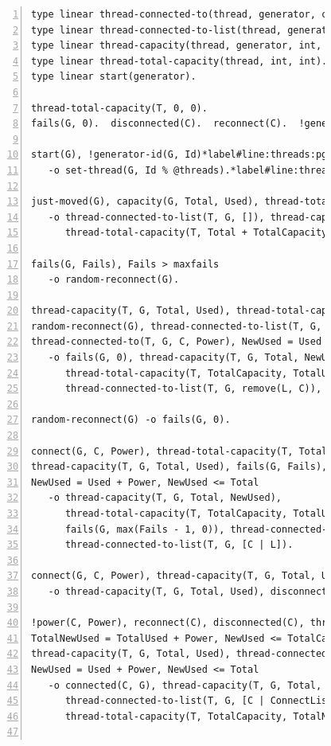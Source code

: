 \begin{figure}[h!]
\begin{Verbatim}[numbers=left,fontsize=\scriptsize,commandchars=*\#\&]
type linear thread-connected-to(thread, generator, consumer, int).
type linear thread-connected-to-list(thread, generator, list consumer).
type linear thread-capacity(thread, generator, int, int).
type linear thread-total-capacity(thread, int, int).
type linear start(generator).

thread-total-capacity(T, 0, 0).
fails(G, 0).  disconnected(C).  reconnect(C).  !generators(C, all-generators).  start(G).

start(G), !generator-id(G, Id)*label#line:threads:pgt_start1&
   -o set-thread(G, Id % @threads).*label#line:threads:pgt_start2&

just-moved(G), capacity(G, Total, Used), thread-total-capacity(T, TotalCapacity, TotalUsed)*label#line:threads:pgt_moved1&
   -o thread-connected-to-list(T, G, []), thread-capacity(T, G, Total, Used),
      thread-total-capacity(T, Total + TotalCapacity, Used + TotalUsed).*label#line:threads:pgt_moved2&

fails(G, Fails), Fails > maxfails
   -o random-reconnect(G).

thread-capacity(T, G, Total, Used), thread-total-capacity(T, TotalCapacity, TotalUsed),
random-reconnect(G), thread-connected-to-list(T, G, L), L <> [], C = nth(L, randint(length(L))),
thread-connected-to(T, G, C, Power), NewUsed = Used - Power
   -o fails(G, 0), thread-capacity(T, G, Total, NewUsed),
      thread-total-capacity(T, TotalCapacity, TotalUsed - Power),
      thread-connected-to-list(T, G, remove(L, C)), disconnect(C, G).

random-reconnect(G) -o fails(G, 0).

connect(G, C, Power), thread-total-capacity(T, TotalCapacity, TotalUsed),*label#line:threads:pgt_gen1&
thread-capacity(T, G, Total, Used), fails(G, Fails), thread-connected-to-list(T, G, L),
NewUsed = Used + Power, NewUsed <= Total
   -o thread-capacity(T, G, Total, NewUsed),
      thread-total-capacity(T, TotalCapacity, TotalUsed + Power),
      fails(G, max(Fails - 1, 0)), thread-connected-to(T, G, C, Power),
      thread-connected-to-list(T, G, [C | L]).

connect(G, C, Power), thread-capacity(T, G, Total, Used), Used + Power > Total, fails(G, Fails)
   -o thread-capacity(T, G, Total, Used), disconnect(C, G), fails(G, Fails + 1).*label#line:threads:pgt_gen2&

!power(C, Power), reconnect(C), disconnected(C), thread-total-capacity(T, TotalCapacity, TotalUsed),*label#line:threads:pgt_con1&
TotalNewUsed = TotalUsed + Power, NewUsed <= TotalCapacity,
thread-capacity(T, G, Total, Used), thread-connected-to-list(T, G, ConnectList),
NewUsed = Used + Power, NewUsed <= Total
   -o connected(C, G), thread-capacity(T, G, Total, NewUsed),
      thread-connected-to-list(T, G, [C | ConnectList]), thread-connected-to(T, G, C, Power),
      thread-total-capacity(T, TotalCapacity, TotalNewUsed).*label#line:threads:pgt_con2&


\end{Verbatim}
\end{figure}
